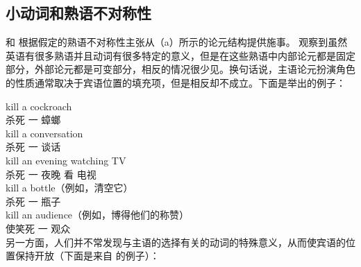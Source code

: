 \subsection{小动词和熟语不对称性}
\label{idiom-asym}

\citet{Marantz84a}和 \citet{Kratzer96a}根据假定的熟语不对称性主张从（a）所示的论元结构提供施事。 \citet{Marantz84a}观察到虽然英语有很多熟语并且动词有很多特定的意义，但是在这些熟语中内部论元都是固定部分，外部论元都是可变部分，相反的情况很少见。换句话说，主语论元扮演角色的性质通常取决于宾语位置的填充项，但是相反却不成立。下面是\citet[]{Kratzer96a}举出的例子：

\eal
\ex 
\gll kill a cockroach\\
     杀死 一 蟑螂\\
\ex 
\gll kill a conversation\\
    杀死 一 谈话\\
\ex 
\gll kill an evening watching TV\\
     杀死 一 夜晚 看 电视\\
\ex 
\gll kill a bottle（例如，清空它）\\
     杀死 一 瓶子\\
\ex 
\gll kill an audience（例如，博得他们的称赞） \\
     使笑死 一 观众\\
\zl
另一方面，人们并不常发现与主语的选择有关的动词的特殊意义，从而使宾语的位置保持开放（下面是来自 的例子）：

